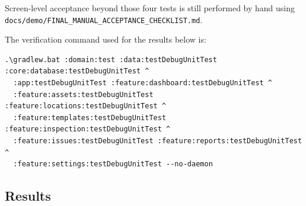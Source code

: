 \documentclass[11pt,a4paper]{article}
\newcommand{\file}[1]{{\small\texttt{#1}}}
\begin{document}
Screen-level acceptance beyond those four tests is still performed by hand using
\file{docs/demo/FINAL\_MANUAL\_ACCEPTANCE\_CHECKLIST.md}.

The verification command used for the results below is:

\begin{lstlisting}[language={},caption={Module-scoped verification (PowerShell).}]
.\gradlew.bat :domain:test :data:testDebugUnitTest :core:database:testDebugUnitTest ^
  :app:testDebugUnitTest :feature:dashboard:testDebugUnitTest ^
  :feature:assets:testDebugUnitTest :feature:locations:testDebugUnitTest ^
  :feature:templates:testDebugUnitTest :feature:inspection:testDebugUnitTest ^
  :feature:issues:testDebugUnitTest :feature:reports:testDebugUnitTest ^
  :feature:settings:testDebugUnitTest --no-daemon
\end{lstlisting}

\subsection{Results}
\end{document}
